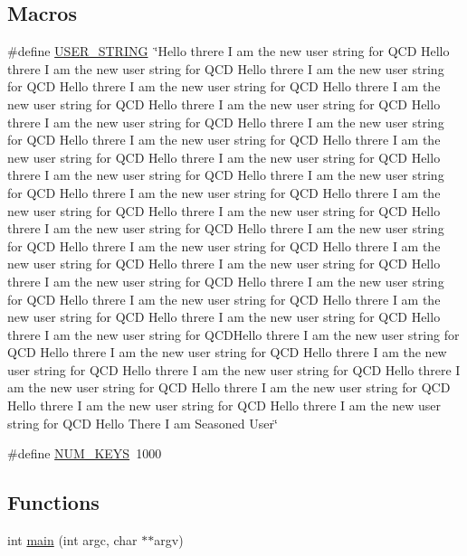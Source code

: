 \subsection*{Macros}
\begin{DoxyCompactItemize}
\item 
\#define \mbox{\hyperlink{adat-devel_2other__libs_2filedb_2src_2AllConfCreateTest_8cpp_a5fdc86a0c07ccece3ef65e2f46c0ffd4}{U\+S\+E\+R\+\_\+\+S\+T\+R\+I\+NG}}~\char`\"{}Hello threre I am the new user string for Q\+CD Hello threre I am the new user string for Q\+CD Hello threre I am the new user string for Q\+CD Hello threre I am the new user string for Q\+CD Hello threre I am the new user string for Q\+CD Hello threre I am the new user string for Q\+CD Hello threre I am the new user string for Q\+CD Hello threre I am the new user string for Q\+CD Hello threre I am the new user string for Q\+CD Hello threre I am the new user string for Q\+CD Hello threre I am the new user string for Q\+CD Hello threre I am the new user string for Q\+CD Hello threre I am the new user string for Q\+CD Hello threre I am the new user string for Q\+CD Hello threre I am the new user string for Q\+CD Hello threre I am the new user string for Q\+CD Hello threre I am the new user string for Q\+CD Hello threre I am the new user string for Q\+CD Hello threre I am the new user string for Q\+CD Hello threre I am the new user string for Q\+CD Hello threre I am the new user string for Q\+CD Hello threre I am the new user string for Q\+CD Hello threre I am the new user string for Q\+CD Hello threre I am the new user string for Q\+CD Hello threre I am the new user string for Q\+CD Hello threre I am the new user string for Q\+CD Hello threre I am the new user string for Q\+C\+D\+Hello threre I am the new user string for Q\+CD  Hello threre I am the new user string for Q\+CD Hello threre I am the new user string for Q\+CD Hello threre I am the new user string for Q\+CD Hello threre I am the new user string for Q\+CD Hello threre I am the new user string for Q\+CD Hello threre I am the new user string for Q\+CD Hello threre I am the new user string for Q\+CD Hello There I am Seasoned User\char`\"{}
\item 
\#define \mbox{\hyperlink{adat-devel_2other__libs_2filedb_2src_2AllConfCreateTest_8cpp_a9a8c7403a867e0c9543467ee8754050d}{N\+U\+M\+\_\+\+K\+E\+YS}}~1000
\end{DoxyCompactItemize}
\subsection*{Functions}
\begin{DoxyCompactItemize}
\item 
int \mbox{\hyperlink{adat-devel_2other__libs_2filedb_2src_2AllConfCreateTest_8cpp_a3c04138a5bfe5d72780bb7e82a18e627}{main}} (int argc, char $\ast$$\ast$argv)
\end{DoxyCompactItemize}


